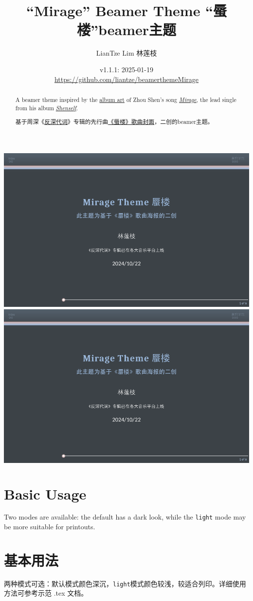\documentclass{article}
\title{``Mirage'' Beamer Theme “蜃楼”beamer主题}
\author{LianTze Lim 林莲枝}
\date{v1.1.1: 2025-01-19\\\url{https://github.com/liantze/beamerthemeMirage}}
\begin{document}
\maketitle

\begin{paracol}{2}
\begin{abstract}
A beamer theme inspired by the
\href{https://www.instagram.com/juncenart/p/C5LuwoSrBnW/?img_index=2}{album art} of Zhou Shen's song \href{https://open.spotify.com/track/1PR9aOkY0dyRRL81YXv9a4}{\emph{Mirage}},
the lead single from his album \href{https://open.spotify.com/album/6IcyslRZfwWzpdhnFML6cd}{\emph{Shenself}}.
\end{abstract}

\switchcolumn

\renewcommand*{\abstractname}{摘要}
\begin{abstract}
基于周深《\href{https://y.qq.com/n/ryqq/albumDetail/003szpvI3LMhQ7}{反深}\href{https://music.163.com/\#/album?id=190605791}{代词}》专辑的先行曲\href{http://xhslink.com/a/oF7IHZ0uUYkY}{《蜃楼》歌曲封面}，二创的beamer主题。
\end{abstract}
\end{paracol}

\begin{center}
\includegraphics[page=1,width=.495\hsize]{mirage-beamer-zh.pdf}
\includegraphics[page=5,width=.495\hsize]{mirage-beamer-zh.pdf}
\end{center}
    
\begin{paracol}{2}
\section{Basic Usage}

Two modes are available: the default has a dark look, while the
\texttt{light} mode may be more suitable for printouts.

\switchcolumn

\section{基本用法}

两种模式可选：默认模式颜色深沉，\texttt{light}模式颜色较浅，较适合列印。详细使用方法可参考示范 .tex 文档。

\end{paracol}
\end{document}
